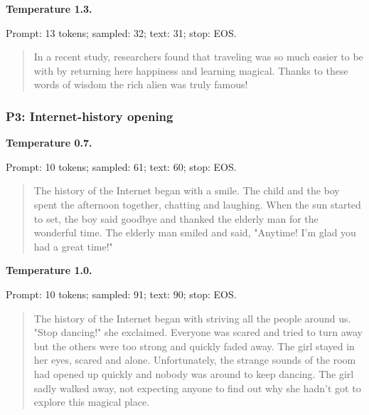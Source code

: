 
\textbf{Temperature 1.3.}

{\footnotesize Prompt: 13 tokens; sampled: 32; text: 31; stop: EOS.}

\begin{quote}\small

In a recent study, researchers found that traveling was so much easier to be with by returning here happiness and learning magical.
Thanks to these words of wisdom the rich alien was truly famous!

\end{quote}

\subsubsection{P3: Internet-history opening}


\textbf{Temperature 0.7.}

{\footnotesize Prompt: 10 tokens; sampled: 61; text: 60; stop: EOS.}

\begin{quote}\small

The history of the Internet began with a smile.
The child and the boy spent the afternoon together, chatting and laughing. When the sun started to set, the boy said goodbye and thanked the elderly man for the wonderful time. The elderly man smiled and said, "Anytime! I'm glad you had a great time!"

\end{quote}


\textbf{Temperature 1.0.}

{\footnotesize Prompt: 10 tokens; sampled: 91; text: 90; stop: EOS.}

\begin{quote}\small

The history of the Internet began with striving all the people around us. "Stop dancing!" she exclaimed. Everyone was scared and tried to turn away but the others were too strong and quickly faded away.
The girl stayed in her eyes, scared and alone. Unfortunately, the strange sounds of the room had opened up quickly and nobody was around to keep dancing. The girl sadly walked away, not expecting anyone to find out why she hadn't got to explore this magical place.

\end{quote}

